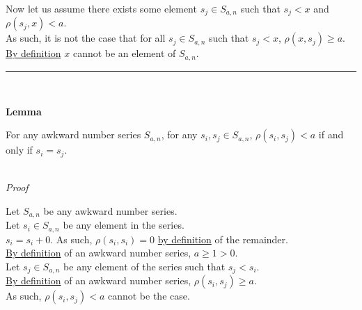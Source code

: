 \documentclass[a4paper,12pt]{article}
\begin{document}
\noindent Now let us assume there exists some element $s_j \in S_{a, n}$ such that $s_j < x$ and $\rho(s_j, x) < a$.\\

\noindent As such, it is not the case that for all $s_j \in S_{a, n}$ such that $s_j < x$, $\rho(x, s_j) \geq a$.\\

\noindent \hyperlink{definition:awkward_number_series}{By definition} $x$ cannot be an element of $S_{a, n}$.


\begin{center}
\noindent\rule{8cm}{0.4pt}
\end{center}
\noindent \\









\label{lemma:non_divisibility_of_elements}
\hypertarget{lemma:non_divisibility_of_elements}{}
\begin{tcolorbox}
\textbf{Lemma}

For any awkward number series $S_{a, n}$, for any $s_i, s_j \in S_{a, n}$, $\rho(s_i, s_j) < a$ if and only if $s_i = s_j$.
\end{tcolorbox}

\noindent \\
\textit{Proof}

\noindent Let $S_{a, n}$ be any awkward number series.\\

\noindent Let $s_i \in S_{a, n}$ be any element in the series.\\

\noindent $s_i = s_i + 0$. As such, $\rho(s_i, s_i) = 0$ \hyperlink{theorem:remainder_theorem}{by definition} of the remainder.\\

\noindent \hyperlink{definition:awkward_number_series}{By definition} of an awkward number series, $a \geq 1 > 0$.\\

\noindent Let $s_j \in S_{a, n}$ be any element of the series such that $s_j < s_i$.\\

\noindent \hyperlink{definition:awkward_number_series}{By definition} of an awkward number series, $\rho(s_i, s_j) \geq a$.\\

\noindent As such, $\rho(s_i, s_j) < a$ cannot be the case.\\
\end{document}
